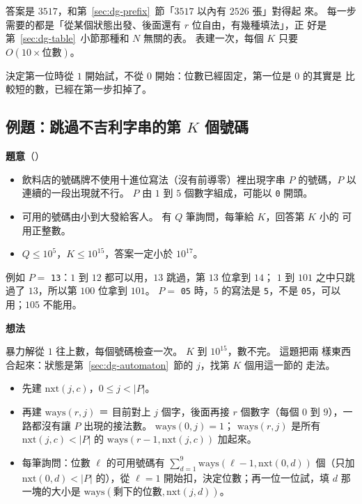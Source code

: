 答案是 $3517$，和第~\ref{sec:dg-prefix}~節「$3517$ 以內有 $2526$ 張」對得起
來。 每一步需要的都是「從某個狀態出發、後面還有 $r$ 位自由，有幾種填法」，正
好是第~\ref{sec:dg-table}~小節那種和 $N$ 無關的表。 表建一次，每個 $K$ 只要
$O(10 \times \text{位數})$。

決定第一位時從 $1$ 開始試，不從 $0$ 開始：位數已經固定，第一位是 $0$ 的其實是
比較短的數，已經在第一步扣掉了。

\subsection{例題：跳過不吉利字串的第 \texorpdfstring{$K$}{K} 個號碼}
\label{sec:dg-ex-skip}

\textbf{題意}（）

\begin{itemize}
\item 飲料店的號碼牌不使用十進位寫法（沒有前導零）裡出現字串 $P$ 的號碼，$P$ 以
連續的一段出現就不行。 $P$ 由 $1$ 到 $5$ 個數字組成，可能以 \texttt{0} 開頭。
\item 可用的號碼由小到大發給客人。 有 $Q$ 筆詢問，每筆給 $K$，回答第 $K$ 小的
可用正整數。
\item $Q \le 10^5$，$K \le 10^{15}$，答案一定小於 $10^{17}$。
\end{itemize}

例如 $P =$ \texttt{13}：$1$ 到 $12$ 都可以用，$13$ 跳過，第 $13$ 位拿到 $14$；
$1$ 到 $101$ 之中只跳過了 $13$，所以第 $100$ 位拿到 $101$。 $P =$ \texttt{05}
時，$5$ 的寫法是 \texttt{5}，不是 \texttt{05}，可以用；$105$ 不能用。

\textbf{想法}

暴力解從 $1$ 往上數，每個號碼檢查一次。 $K$ 到 $10^{15}$，數不完。 這題把兩
樣東西合起來：狀態是第~\ref{sec:dg-automaton}~節的 $j$，找第 $K$ 個用這一節的
走法。

\begin{itemize}
\item 先建 $\mathrm{nxt}(j, c)$，$0 \le j < |P|$。
\item 再建 $\mathrm{ways}(r, j)$ ＝ 目前對上 $j$ 個字，後面再接 $r$ 個數字（每個
$0$ 到 $9$），一路都沒有讓 $P$ 出現的接法數。 $\mathrm{ways}(0, j) = 1$；
$\mathrm{ways}(r, j)$ 是所有 $\mathrm{nxt}(j, c) < |P|$ 的
$\mathrm{ways}(r - 1, \mathrm{nxt}(j, c))$ 加起來。
\item 每筆詢問：位數 $\ell$ 的可用號碼有 $\sum_{d=1}^{9}
\mathrm{ways}(\ell - 1, \mathrm{nxt}(0, d))$ 個（只加 $\mathrm{nxt}(0, d) <
|P|$ 的），從 $\ell = 1$ 開始扣，決定位數；再一位一位試，填 $d$ 那一塊的大小是
$\mathrm{ways}(\text{剩下的位數}, \mathrm{nxt}(j, d))$。
\end{itemize}

